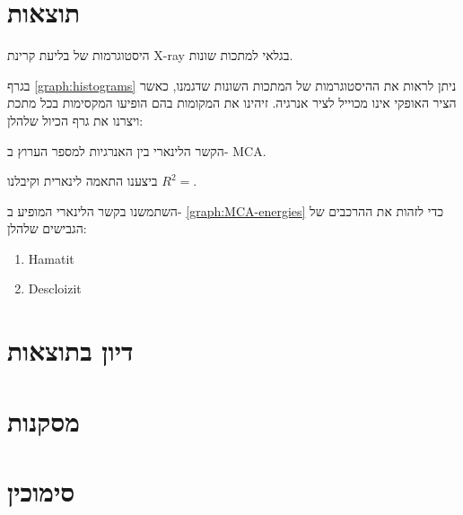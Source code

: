 \documentclass{article}
\begin{document}
\section{תוצאות}

\begin{graph}
    \centering
    \caption{
    היסטוגרמות של בליעת קרינת
    \textenglish{X-ray}
    בגלאי למתכות שונות.
    }
    \label{graph:histograms}
\end{graph}

בגרף
\ref{graph:histograms}
ניתן לראות את ההיסטוגרמות של המתכות השונות שדגמנו, כאשר הציר האופקי אינו מכוייל לציר אנרגיה. זיהינו את המקומות בהם הופיעו המקסימות בכל מתכת ויצרנו את גרף הכיול שלהלן:

\begin{graph}[ht!]
    \centering
    \caption{
    הקשר הלינארי בין האנרגיות למספר הערוץ ב-
    \textenglish{MCA}.
    }
    \label{graph:MCA-energies}
\end{graph}

ביצענו התאמה לינארית וקיבלנו
$R^2 = $.

השתמשנו בקשר הלינארי המופיע ב-
\ref{graph:MCA-energies}
כדי לזהות את ההרכבים של הגבישים שלהלן:
\begin{enumerate}
    \item Hamatit
    \item Descloizit
\end{enumerate}


\section{דיון בתוצאות}

\section{מסקנות}

\section*{סימוכין}
\begin{english}
\printbibliography[heading=none]{}
\end{english}
\end{document}
